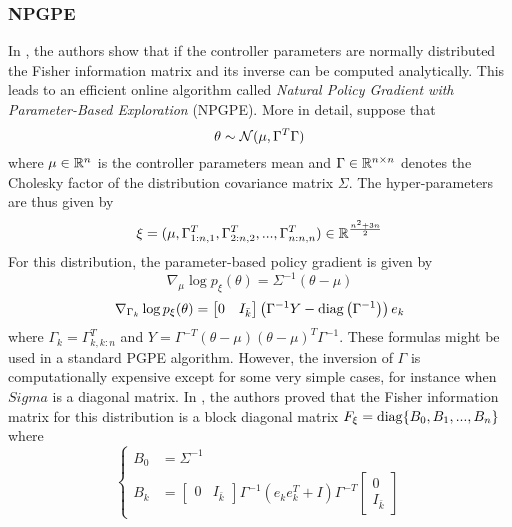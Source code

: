 \subsubsection{NPGPE}
In \cite{miyamae2010natural}, the authors show that if the controller parameters are normally distributed the Fisher information matrix and its inverse can be computed analytically. This leads to an efficient online algorithm called \emph{Natural Policy Gradient with Parameter-Based Exploration} (NPGPE). More in detail, suppose that
\begin{equation*}
	\theta \sim \mathcal{N}(\mu, \Gamma^T \Gamma)
\end{equation*} 
where $\mu\in\mathbb{R}^n$ is the controller parameters mean and $\Gamma \in \mathbb{R}^{n\times n}$ denotes the Cholesky factor of the distribution covariance matrix $\Sigma$. The hyper-parameters are thus given by 
\begin{equation*}
	\xi = (\mu, \Gamma_{1:n,1}^T, \Gamma_{2:n,2}^T, ... , \Gamma_{n:n,n}^T) \in \mathbb{R}^\frac{n^2 + 3n}{2}
\end{equation*}
For this distribution, the parameter-based policy gradient is given by
\begin{equation}
	\nabla_\mu \log p_\xi(\theta) = \Sigma^{-1} (\theta - \mu)
\end{equation}
\begin{equation}
	\nabla_{\Gamma_k} \log p_\xi(\theta) = \begin{bmatrix} 0 & I_{\bar{k}} \end{bmatrix} \left(\Gamma^{-1} Y - \operatorname{diag}\left(\Gamma^{-1}\right)\right) e_k
\end{equation}
where $\Gamma_k = \Gamma_{k,k:n}^T$ and $Y = \Gamma^{-T} (\theta - \mu) (\theta - \mu)^T \Gamma^{-1}$. These formulas might be used in a standard PGPE algorithm. However, the inversion of $\Gamma$ is computationally expensive except for some very simple cases, for instance when $Sigma$ is a diagonal matrix. In \cite{sun2009efficient}, the authors proved that the Fisher information matrix for this distribution is a block diagonal matrix $F_\xi = \operatorname{diag}\{B_0, B_1, ..., B_n\}$ where
\begin{equation*}
	\begin{cases}
		B_0 &= \Sigma^{-1}\\	
		B_k &= \begin{bmatrix}
				0 & I_{\bar{k}}
		\end{bmatrix} \Gamma^{-1} (e_k e_k^T + I) \Gamma^{-T} \begin{bmatrix}
						0 \\ I_{\bar{k}}
				\end{bmatrix}
	\end{cases}
\end{equation*}
